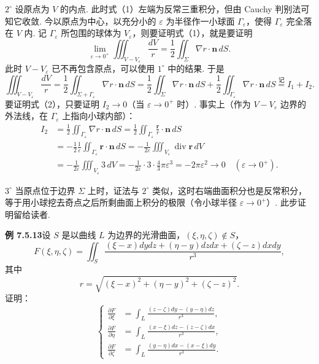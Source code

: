 \documentclass[UTF8,12pt,a4paper,fontset=fandol]{ctexart}
\providecommand{\xlongequal}[1]{\overset{#1}{=}}
\begin{document}
$2^\circ$ 设原点为 $V$ 的内点. 此时式（1）左端为反常三重积分，但由 Cauchy 判别法可知它收敛. 今以原点为中心，以充分小的 $\varepsilon$ 为半径作一小球面 $\Gamma_\varepsilon$，使得 $\Gamma_\varepsilon$ 完全落在 $V$ 内. 记 $\Gamma_\varepsilon$ 所包围的球体为 $V_\varepsilon$，则要证明式（1），就是要证明
\[
\lim_{\varepsilon\to0^+}\iiint_{V-V_\varepsilon}\frac{dV}{r}
=\frac12\iint_\Sigma\nabla r\cdot\mathbf n\,dS. \tag{2}
\]
此时 $V-V_\varepsilon$ 已不再包含原点，可以使用 $1^\circ$ 中的结果. 于是
\[
\iiint_{V-V_\varepsilon}\frac{dV}{r}
=\frac12\iint_{\Sigma+\Gamma_\varepsilon}\nabla r\cdot\mathbf n\,dS
=\frac12\iint_\Sigma\nabla r\cdot\mathbf n\,dS
+\frac12\iint_{\Gamma_\varepsilon}\nabla r\cdot\mathbf n\,dS
\xlongequal{\text{记}}I_1+I_2.
\]
要证明式（2），只要证明 $I_2\to0$（当 $\varepsilon\to0^+$ 时）. 事实上（作为 $V-V_\varepsilon$ 边界的外法线，在 $\Gamma_\varepsilon$ 上指向小球内部）：
\[
\begin{aligned}
I_2&=\frac12\iint_{\Gamma_\varepsilon}\nabla r\cdot\mathbf n\,dS
=\frac12\iint_{\Gamma_\varepsilon}\frac{\mathbf r}{r}\cdot\mathbf n\,dS\\
&=-\frac12\frac1\varepsilon\iint_{\Gamma_\varepsilon}\mathbf r\cdot\mathbf n\,dS
=-\frac1{2\varepsilon}\iiint_{V_\varepsilon}\operatorname{div}\mathbf r\,dV\\
&=-\frac1{2\varepsilon}\iiint_{V_\varepsilon}3\,dV
=-\frac1{2\varepsilon}\cdot3\cdot\frac43\pi\varepsilon^3
=-2\pi\varepsilon^2\to0\quad(\varepsilon\to0^+).
\end{aligned}
\]

$3^\circ$ 当原点位于边界 $\Sigma$ 上时，证法与 $2^\circ$ 类似，这时右端曲面积分也是反常积分，等于用小球挖去奇点之后所剩曲面上积分的极限（令小球半径 $\varepsilon\to0^+$）. 此步证明留给读者.

\noindent\textbf{例 7.5.13}\quad 设 $S$ 是以曲线 $L$ 为边界的光滑曲面，$(\xi,\eta,\zeta)\notin S$，
\[
F(\xi,\eta,\zeta)=\iint_S\frac{(\xi-x)dydz+(\eta-y)dzdx+(\zeta-z)dxdy}{r^3}, \tag{1}
\]
其中
\[
r=\sqrt{(\xi-x)^2+(\eta-y)^2+(\zeta-z)^2}.
\]
证明：
\[
\left\{
\begin{aligned}
\frac{\partial F}{\partial\xi}
&=\int_L\frac{(z-\zeta)dy-(y-\eta)dz}{r^3},\\
\frac{\partial F}{\partial\eta}
&=\int_L\frac{(x-\xi)dz-(z-\zeta)dx}{r^3},\\
\frac{\partial F}{\partial\zeta}
&=\int_L\frac{(y-\eta)dx-(x-\xi)dy}{r^3}.
\end{aligned}
\right. \tag{2}
\]
\end{document}
